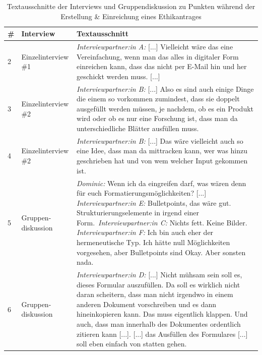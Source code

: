 \documentclass[a4paper,12pt,twoside]{scrreprt}
\begin{document}
\begin{table}[ht!]
    \centering
    \begin{tabular}{p{.05\linewidth} | p{.2\linewidth} | p{.65\linewidth}}
        \# & \textbf{Interview} & \textbf{Textausschnitt}\\
        \hline
        2 & Einzelinterview \#1 & \textit{Interviewpartner:in A:} [...] Vielleicht wäre das eine Vereinfachung, wenn man das alles in digitaler Form einreichen kann, dass das nicht per E-Mail hin und her geschickt werden muss. [...] \\
        \hline
        3 & Einzelinterview \#2 & \textit{Interviewpartner:in B:} [...] Also es sind auch einige Dinge die einem so vorkommen zumindest, dass sie doppelt ausgefüllt werden müssen, je nachdem, ob es ein Produkt wird oder ob es nur eine Forschung ist, dass man da unterschiedliche Blätter ausfüllen muss. \\
        \hline
        4 & Einzelinterview \#2 & \textit{Interviewpartner:in B:} [...]  Das wäre vielleicht auch so eine Idee, dass man da mittracken kann, wer was hinzu geschrieben hat und von wem welcher Input gekommen ist. \\
        \hline
        5 & Gruppen-diskussion & \textit{Dominic:} Wenn ich da eingreifen darf, was wären denn für euch Formatierungsmöglichkeiten? [...]\newline
        \textit{Interviewpartner:in E:} Bulletpoints, das wäre gut. Strukturierungselemente in irgend einer Form.\newline\
        \textit{Interviewpartner:in C:} Nichts fett. Keine Bilder.\newline
        \textit{Interviewpartner:in F:} Ich bin auch eher der hermeneutische Typ. Ich hätte null Möglichkeiten vorgesehen, aber Bulletpoints sind Okay. Aber sonsten nada. \\
        \hline
        6 & Gruppen-diskussion & \textit{Interviewpartner:in D:} [...] Nicht mühsam sein soll es, dieses Formular auszufüllen. Da soll es wirklich nicht daran scheitern, dass man nicht irgendwo in einem anderen Dokument vorschreiben und es dann hineinkopieren kann. Das muss eigentlich klappen. Und auch, dass man innerhalb des Dokumentes ordentlich zitieren kann [...]. [...] das Ausfüllen des Formulares [...] soll eben einfach von statten gehen. \\
    \end{tabular}
    \caption{Textausschnitte der Interviews und Gruppendiskussion zu Punkten während der Erstellung \& Einreichung eines Ethikantrages}
    \label{tab:anforderungen-während-erstellung-einreichung}
\end{table}
\end{document}
